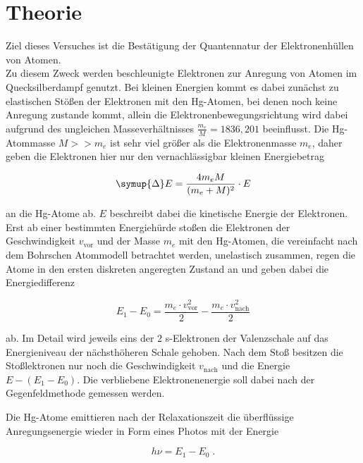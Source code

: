 \section{Theorie}
\label{sec:Theorie}

Ziel dieses Versuches ist die Bestätigung der Quantennatur der Elektronenhüllen von 
Atomen.\\

Zu diesem Zweck werden beschleunigte Elektronen zur Anregung von Atomen 
im Quecksilberdampf genutzt. Bei kleinen Energien kommt es dabei zunächst zu 
elastischen Stößen der Elektronen mit den Hg-Atomen, bei denen noch keine Anregung
zustande kommt, allein die Elektronenbewegungsrichtung wird dabei aufgrund des ungleichen 
Masseverhältnisses $\frac{m_e}{M} = 1836,201$ beeinflusst. Die Hg-Atommasse $M >> m_e$ ist 
sehr viel größer als die Elektronenmasse $m_e$, daher
geben die Elektronen hier nur den vernachlässigbar kleinen Energiebetrag

\begin{equation}
    \symup{\Delta} E = \frac{4 m_e M}{(m_e + M)^2} \cdot E
\end{equation}

an die Hg-Atome ab. $E$ beschreibt dabei die kinetische Energie der Elektronen.\\

Erst ab einer bestimmten Energiehürde stoßen die Elektronen der Geschwindigkeit
$v_\text{vor}$ und der Masse $m_e$ mit den Hg-Atomen, die vereinfacht nach dem Bohrschen Atommodell betrachtet werden,
unelastisch zusammen, regen die Atome in den ersten diskreten angeregten Zustand an und geben dabei
die Energiedifferenz

\begin{equation}
    E_1 - E_0 = \frac{m_e \cdot v_\text{vor}^2}{2} - \frac{m_e \cdot v_\text{nach}^2}{2}
\end{equation}
 
ab. Im Detail wird jeweils eins der $2$ s-Elektronen der Valenzschale auf das Energieniveau der nächsthöheren Schale
gehoben. Nach dem Stoß besitzen die Stoßlektronen nur noch die Geschwindigkeit $v_\text{nach}$ und die Energie
$E - (E_1 - E_0)$.
Die verbliebene Elektronenenergie soll dabei nach der Gegenfeldmethode gemessen werden.

Die Hg-Atome emittieren nach der Relaxationszeit die überflüssige Anregungsenergie wieder
in Form eines Photos mit der Energie 

\begin{equation}
    h \nu = E_1 - E_0 \; .
\end{equation}

